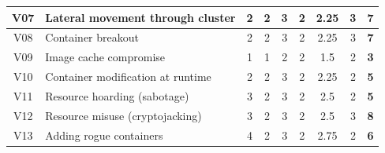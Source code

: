 \begin{landscape}
\begin{table}[]
{\begin{tabular}{|c|l|cccc|cc|c|}
V07             & Lateral movement through cluster                                                       & 2                                        & 2                              & 3                                        & 2                    & 2.25                                   & 3            & \textbf{7}           \\ \hline
V08             & Container breakout                                                                     & 2                                        & 2                              & 3                                        & 2                    & 2.25                                   & 3            & \textbf{7}           \\ \hline
V09             & Image cache compromise                                                                 & 1                                        & 1                              & 2                                        & 2                    & 1.5                                    & 2            & \textbf{3}           \\ \hline
V10             & Container modification at runtime                                                      & 2                                        & 2                              & 3                                        & 2                    & 2.25                                   & 2            & \textbf{5}           \\ \hline
V11             & Resource hoarding (sabotage)                                                           & 3                                        & 2                              & 3                                        & 2                    & 2.5                                    & 2            & \textbf{5}           \\ \hline
V12             & Resource misuse (cryptojacking)                                                        & 3                                        & 2                              & 3                                        & 2                    & 2.5                                    & 3            & \textbf{8}           \\ \hline
V13             & Adding rogue containers                                                                & 4                                        & 2                              & 3                                        & 2                    & 2.75                                   & 2            & \textbf{6}           \\ \hline

\end{tabular}}
\end{table}
\end{landscape}
